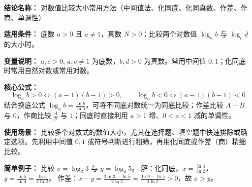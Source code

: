 \textbf{结论名称：} 对数值比较大小常用方法（中间值法、化同底、化同真数、作差、作商、单调性）

\textbf{适用条件：} 底数 $a>0$ 且 $a\neq1$，真数 $N>0$；比较两个对数值 $\log_a b$ 与 $\log_c d$ 的大小时。

\textbf{变量说明：} $a,c>0,\, a,c\neq1$ 为底数，$b,d>0$ 为真数。常用中间值 $0,1$；化同底时常用自然对数或常用对数。

\textbf{核心公式：} 
\[
\boxed{\log_a b > 0 \iff (a-1)(b-1) > 0,\qquad \log_a b < 0 \iff (a-1)(b-1) < 0}
\]
结合换底公式 $\log_a b = \frac{\ln b}{\ln a}$，可将不同底对数统一为同底比较；作差比较 $A-B$ 与 $0$，作商比较 $\frac{A}{B}$ 与 $1$；同底时直接利用 $a>1$ 增、$0<a<1$ 减的单调性。

\textbf{使用场景：} 比较多个对数式的数值大小，尤其在选择题、填空题中快速排除或确定选项。先利用中间值 $0,1$ 或符号判断进行粗筛，再用化同底或作差（商）精细比较。

\textbf{简单例子：} 比较 $x = \log_2 3$ 与 $y = \log_4 5$。
解：化同底，$x = \frac{\ln 3}{\ln 2}$，$y = \frac{\ln 5}{\ln 4} = \frac{\ln 5}{2\ln 2}$。
作差：$x - y = \frac{2\ln 3 - \ln 5}{2\ln 2} = \frac{\ln 9 - \ln 5}{2\ln 2} > 0$，故 $x > y$。